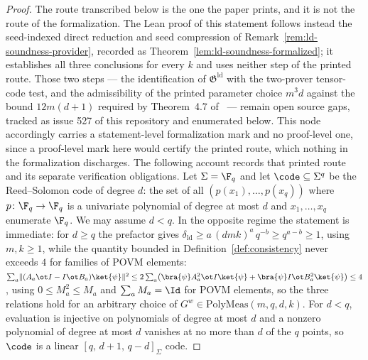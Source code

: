 \begin{proof}
	The route transcribed below is the one the paper prints, and it is not the
	route of the formalization. The Lean proof of this statement follows instead
	the seed-indexed direct reduction and seed compression of
	Remark~\ref{rem:ld-soundness-provider}, recorded as
	Theorem~\ref{lem:ld-soundness-formalized}; it establishes all three
	conclusions for every $k$ and uses neither step of the printed route. Those
	two steps --- the identification of $\mathfrak{G}^{\mathrm{ld}}$ with the
	two-prover tensor-code test, and the admissibility of the printed parameter
	choice $m^3 d$ against the bound $12m(d+1)$ required by Theorem~4.7
	of~\cite{Ji2021Quantum} --- remain open source gaps, tracked as issue 527 of
	this repository and enumerated below. This node accordingly carries a
	statement-level formalization mark and no proof-level one, since a
	proof-level mark here would certify the printed route, which nothing in the
	formalization discharges. The following account records that printed route
	and its separate verification obligations.
	Let $\Sigma = \F_q$ and let $\code \subseteq \Sigma^q$ be the Reed--Solomon code of degree $d$: the set of all $(p(x_1),\ldots,p(x_q))$ where $p\colon \F_q \to \F_q$ is a univariate polynomial of degree at most $d$ and $x_1,\ldots,x_q$ enumerate $\F_q$. We may assume $d < q$. In the opposite regime the statement is immediate: for $d \ge q$ the prefactor gives $\delta_{\mathrm{ld}} \ge a\,(dmk)^a\, q^{-b} \ge q^{a-b} \ge 1$, using $m, k \ge 1$, while the quantity bounded in Definition~\ref{def:consistency} never exceeds $4$ for families of POVM elements: $\sum_a \lVert (A_a \ot I - I \ot B_a)\ket{\psi}\rVert^2 \le 2\sum_a \bigl(\bra{\psi} A_a^2 \ot I \ket{\psi} + \bra{\psi} I \ot B_a^2 \ket{\psi}\bigr) \le 4$, using $0 \le M_a^2 \le M_a$ and $\sum_a M_a = \Id$ for POVM elements, so the three relations hold for an arbitrary choice of $G^w \in \mathrm{PolyMeas}(m,q,d,k)$. For $d < q$, evaluation is injective on polynomials of degree at most $d$ and a nonzero polynomial of degree at most $d$ vanishes at no more than $d$ of the $q$ points, so $\code$ is a linear $[q,\, d+1,\, q-d]_\Sigma$ code.

\end{proof}

